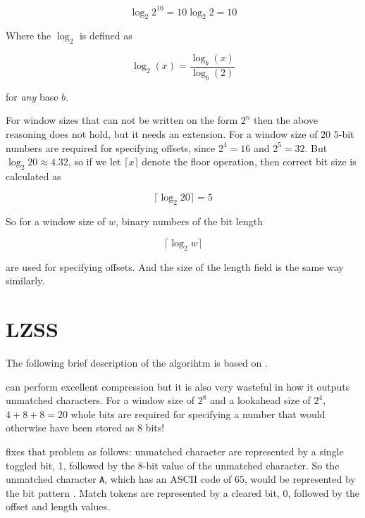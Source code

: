 \begin{equation*}
  \log_2 2^{10} = 10\log_2 2 = 10
\end{equation*}

Where the $\log_2$ is defined as

\begin{equation*}
  \log_2(x) = \frac{\log_b (x)}{\log_b (2)}
\end{equation*}

for \textit{any} base $b$.

For window sizes that can not be written on the form $2^n$ then the
above reasoning does not hold, but it needs an extension. For a window
size of $20$ 5-bit numbers are required for specifying offsets, since
$2^4 = 16$ and $2^5 = 32$. But $\log_2 20 \approx 4.32$, so if we let
$\lceil x \rceil$ denote the floor operation, then correct bit size is
calculated as

\begin{equation*}
  \lceil\log_2 20\rceil = 5
\end{equation*}

So for a window size of $w$, binary numbers of the bit length

\begin{equation*}
  \lceil\log_2 w\rceil
\end{equation*}

are used for specifying offsets. And the size of the length field is
the same way similarly.

\section{LZSS}

The following brief description of the \lzss algorihtm is based on
\cite{Salomon:2004:DCC,mark1996data_compression_book,mcfadden92:_hackin_data_compr_lzss,okumura:_data_compr_algor_larc_lharc}.

\lzone can perform excellent compression but it is also very wasteful in
how it outputs unmatched characters. For a window size of $2^8$ and a
lookahead size of $2^4$, $4 + 8 + 8 = 20$ whole bits are required for
specifying a number that would otherwise have been stored as 8 bits!

\lzss fixes that problem as follows: unmatched character are
represented by a single toggled bit, 1, followed by the 8-bit value of
the unmatched character. So the unmatched character \texttt{A}, which
has an ASCII code of $65$, would be represented by the bit pattern
. Match tokens are represented by a cleared bit, 0,
followed by the offset and length values.

